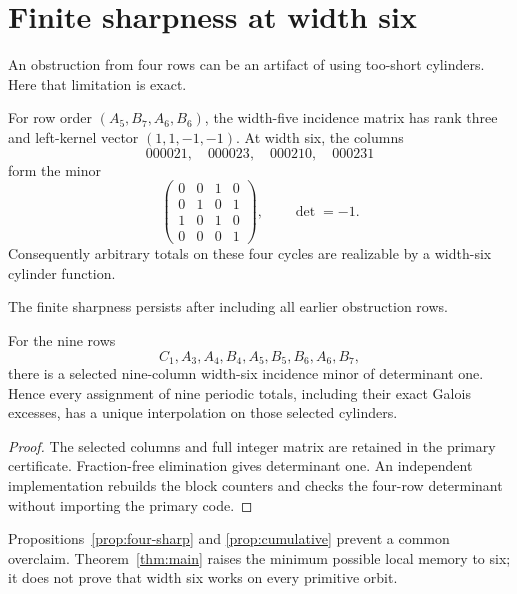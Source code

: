 \section{Finite sharpness at width six}

An obstruction from four rows can be an artifact of using too-short
cylinders.  Here that limitation is exact.

\begin{proposition}\label{prop:four-sharp}
For row order \((A_5,B_7,A_6,B_6)\), the width-five incidence matrix has rank
three and left-kernel vector \((1,1,-1,-1)\).  At width six, the columns
\[
 000021,\quad000023,\quad000210,\quad000231
\]
form the minor
\[
 \begin{pmatrix}
 0&0&1&0\\
 0&1&0&1\\
 1&0&1&0\\
 0&0&0&1
 \end{pmatrix},
 \qquad \det=-1.
\]
Consequently arbitrary totals on these four cycles are realizable by a
width-six cylinder function.
\end{proposition}

The finite sharpness persists after including all earlier obstruction rows.

\begin{proposition}\label{prop:cumulative}
For the nine rows
\[
 C_1,A_3,A_4,B_4,A_5,B_5,B_6,A_6,B_7,
\]
there is a selected nine-column width-six incidence minor of determinant
one.  Hence every assignment of nine periodic totals, including their exact
Galois excesses, has a unique interpolation on those selected cylinders.
\end{proposition}

\begin{proof}
The selected columns and full integer matrix are retained in the primary
certificate.  Fraction-free elimination gives determinant one.  An
independent implementation rebuilds the block counters and checks the
four-row determinant without importing the primary code.
\end{proof}

Propositions~\ref{prop:four-sharp} and \ref{prop:cumulative} prevent a common
overclaim.  Theorem~\ref{thm:main} raises the minimum possible local memory
to six; it does not prove that width six works on every primitive orbit.
